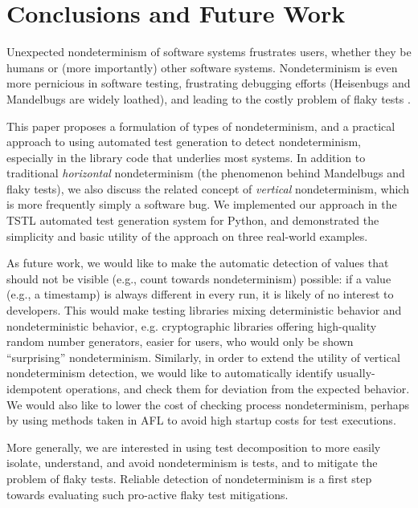 \section{Conclusions and Future Work}

Unexpected nondeterminism of software systems frustrates users,
whether they be humans or (more importantly) other software systems.
Nondeterminism is even more pernicious in software testing,
frustrating debugging efforts (Heisenbugs \cite{Heisenbug} and
Mandelbugs \cite{GrottkeBugs,FaultTriggers} are widely loathed), and
leading to the costly problem of flaky tests
\cite{miccoflaky,listfieldtestanalysis}.

This paper proposes a formulation of types of nondeterminism, and a
practical approach to using automated test generation to detect
nondeterminism, especially in the library code that underlies most
systems. In addition to traditional \emph{horizontal} nondeterminism
(the phenomenon behind Mandelbugs and flaky tests), we also discuss
the related concept of \emph{vertical} nondeterminism, which is more
frequently simply a software bug.  We implemented our approach in the
TSTL automated test generation system for Python, and demonstrated the
simplicity and basic utility of the approach on three real-world examples.

As future work, we would like to make the automatic detection of
values that should not be visible (e.g., count towards nondeterminism)
possible: if a value (e.g., a timestamp) is always different in every
run, it is likely of no interest to developers.  This would make
testing libraries mixing deterministic behavior and nondeterministic
behavior, e.g. cryptographic libraries offering high-quality random
number generators, easier for users, who would only be shown
``surprising'' nondeterminism.  Similarly, in order to extend the
utility of vertical nondeterminism detection, we would like to
automatically identify usually-idempotent operations, and check them
for deviation from the expected behavior.  We would also like to lower the cost
of checking process nondeterminism, perhaps by using methods taken in
AFL \cite{aflfuzz} to avoid high startup costs for test executions.

More generally, we are interested in using test decomposition
\cite{Composition} to more easily isolate, understand, and avoid
nondeterminism is tests, and to mitigate the problem of flaky tests.
Reliable detection of nondeterminism is a first step towards
evaluating such pro-active flaky test mitigations.

